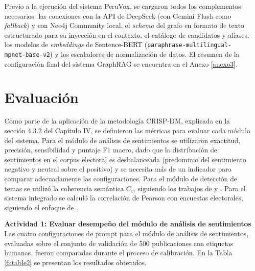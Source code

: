 \documentclass[listof=nochaptergap,12pt,times,authoryear]{report}
\let\cite\textcite
\begin{document}
Previo a la ejecución del sistema PeruVox, se cargaron todos los complementos
necesarios: las conexiones con la API de DeepSeek (con Gemini Flash como
\textit{fallback}) y con Neo4j Community local, el \textit{schema} del grafo en
formato de texto estructurado para su inyección en el contexto, el catálogo de
candidatos y aliases, los modelos de \textit{embeddings} de Sentence-BERT
(\texttt{paraphrase-multilingual-mpnet-base-v2}) y los escaladores de normalización
de datos. El resumen de la configuración final del sistema GraphRAG
se encuentra en el Anexo \ref{anexo3}.

\section{Evaluación}

Como parte de la aplicación de la metodología CRISP-DM, explicada en la sección 4.3.2
del Capítulo IV, se definieron las métricas para evaluar cada módulo del sistema. Para
el módulo de análisis de sentimientos se utilizaron exactitud, precisión, sensibilidad
y puntaje F1 macro, dado que la distribución de sentimientos en el corpus electoral
es desbalanceada (predominio del sentimiento negativo y neutral sobre el positivo) y se
necesita más de un indicador para comparar adecuadamente las configuraciones. Para el
módulo de detección de temas se utilizó la coherencia semántica $C_v$, siguiendo los
trabajos de \cite{pr_mendonca2025bertopic_political} y \cite{pr_janssens2025bertopic_llm}.
Para el sistema integrado se calculó la correlación de Pearson con encuestas electorales,
siguiendo el enfoque de \cite{pr_gujral2024llm_elections}.

\vspace{0.5cm}
\textbf{Actividad 1: Evaluar desempeño del módulo de análisis de sentimientos}
\\
Las cuatro configuraciones de prompt para el módulo de análisis de sentimientos,
evaluadas sobre el conjunto de validación de 500 publicaciones con etiquetas humanas,
fueron comparadas durante el proceso de calibración. En la Tabla \ref{6:table2} se
presentan los resultados obtenidos.
\end{document}
